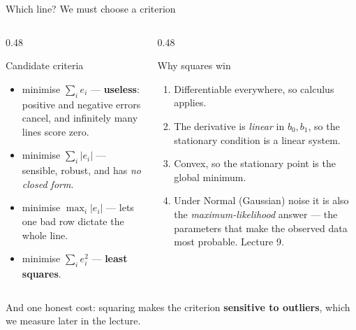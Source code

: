 \documentclass[aspectratio=169]{beamer}
\begin{document}
\begin{frame}[shrink=6]{Which line? We must choose a criterion}
  \begin{columns}[T]
    \begin{column}{0.48\textwidth}
      \begin{block}{Candidate criteria}
        \small
        \begin{itemize}
          \item minimise $\sum_i e_i$ --- \textbf{useless}: positive and
            negative errors cancel, and infinitely many lines score zero.
          \item minimise $\sum_i |e_i|$ --- sensible, robust, and has
            \emph{no closed form}.
          \item minimise $\max_i |e_i|$ --- lets one bad row dictate the
            whole line.
          \item minimise $\sum_i e_i^2$ --- \textbf{least squares}.
        \end{itemize}
      \end{block}
    \end{column}
    \begin{column}{0.48\textwidth}
      \begin{exampleblock}{Why squares win}
        \small
        \begin{enumerate}
          \item Differentiable everywhere, so calculus applies.
          \item The derivative is \emph{linear} in $b_0, b_1$, so the
            stationary condition is a linear system.
          \item Convex, so the stationary point is the global minimum.
          \item Under Normal (Gaussian) noise it is also the
            \emph{maximum-likelihood} answer --- the parameters that make the
            observed data most probable. Lecture 9.
        \end{enumerate}
      \end{exampleblock}
    \end{column}
  \end{columns}
  \vspace{0.2em}
  \begin{center}\small
    And one honest cost: squaring makes the criterion \textbf{sensitive to
    outliers}, which we measure later in the lecture.
  \end{center}
\end{frame}
\end{document}
